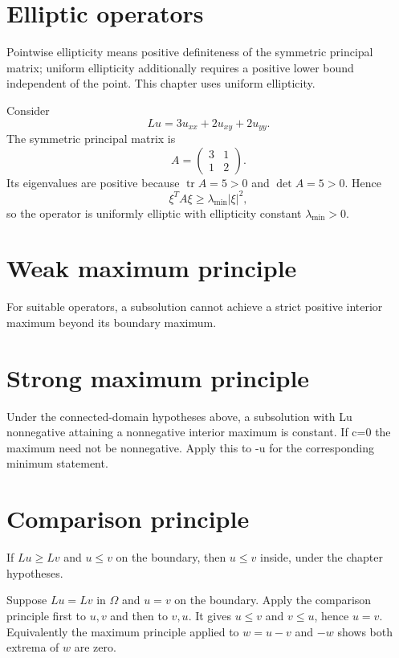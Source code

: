 \section{Elliptic operators}
Pointwise ellipticity means positive definiteness of the symmetric principal matrix; uniform ellipticity additionally requires a positive lower bound independent of the point. This chapter uses uniform ellipticity.


\begin{example}\label{ex:iii27-expand-01}
Consider
\[
Lu=3u_{xx}+2u_{xy}+2u_{yy}.
\]
The symmetric principal matrix is
\[
A=\begin{pmatrix}3&1\\1&2\end{pmatrix}.
\]
Its eigenvalues are positive because \(\operatorname{tr}A=5>0\) and
\(\det A=5>0\). Hence
\[
\xi^T A\xi\ge \lambda_{\min}|\xi|^2,
\]
so the operator is uniformly elliptic with ellipticity constant
\(\lambda_{\min}>0\).
\end{example}
\section{Weak maximum principle}
For suitable operators, a subsolution cannot achieve a strict positive interior maximum beyond its boundary maximum.

\section{Strong maximum principle}
Under the connected-domain hypotheses above, a subsolution with Lu nonnegative attaining a nonnegative interior maximum is constant. If c=0 the maximum need not be nonnegative. Apply this to -u for the corresponding minimum statement.

\section{Comparison principle}
If $Lu\ge Lv$ and $u\le v$ on the boundary, then $u\le v$ inside, under the chapter hypotheses.


\begin{example}\label{ex:iii27-expand-02}
Suppose \(Lu=Lv\) in \(\Omega\) and \(u=v\) on the boundary. Apply the
comparison principle first to \(u,v\) and then to \(v,u\). It gives
\(u\le v\) and \(v\le u\), hence \(u=v\). Equivalently the maximum principle
applied to \(w=u-v\) and \(-w\) shows both extrema of \(w\) are zero.
\end{example}
